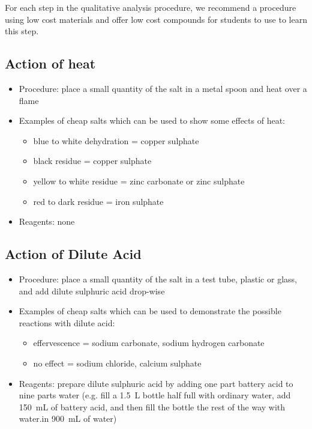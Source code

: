 For each step in the qualitative analysis procedure, 
we recommend a procedure using low cost materials 
and offer low cost compounds for students to use to learn this step.



\subsection{Action of heat}
\begin{itemize}
\item{Procedure: place a small quantity of the salt 
in a metal spoon and heat over a flame}
\item{Examples of cheap salts which can be used to show some effects of heat:} 
\begin{itemize}
\item{blue to white dehydration = copper sulphate}
\item{black residue = copper sulphate}
\item{yellow to white residue = zinc carbonate or zinc sulphate} 
\item{red to dark residue = iron sulphate}
\end{itemize}
\item{Reagents: none}
\end{itemize}

\subsection{Action of Dilute Acid} 
\begin{itemize}
\item{Procedure: place a small quantity of the salt in a test tube, 
plastic or glass, 
and add dilute sulphuric acid drop-wise}
\item{Examples of cheap salts which can be used to demonstrate the possible reactions with dilute acid:}
\begin{itemize}
\item{effervescence = sodium carbonate, 
sodium hydrogen carbonate}
\item{no effect = sodium chloride, 
calcium sulphate}
\end{itemize}
\item{Reagents: prepare dilute sulphuric acid 
by adding one part battery acid to nine parts water (e.g. 
fill a 1.5~L bottle half full with ordinary water, 
add 150~mL of battery acid, 
and then fill the bottle the rest of the way 
with water.in 900~mL of water)}
\end{itemize}

